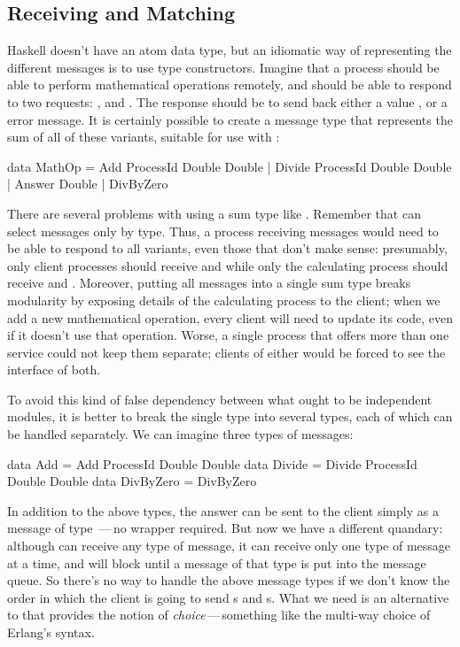 \documentclass[preprint]{sigplanconf}
\begin{document}
\subsection{Receiving and Matching}

Haskell doesn't have an atom data type, but an idiomatic way of representing the different messages is to use type constructors. Imagine that a process should be able to perform mathematical operations remotely, and should be able to respond to two requests: , and . 
The response should be to send back either a value , or a  error message.
It is certainly possible to create a message type that represents the sum of all of these variants, suitable for use with :

\begin{code}
data MathOp = Add ProcessId Double Double
            | Divide ProcessId Double Double
            | Answer Double
            | DivByZero
\end{code}

There are several problems with using a sum type like .
Remember that  can select messages only by type.
Thus, a process receiving  messages would need to be able to respond to all variants, even those that don't make sense: presumably, only client processes should receive  and  while only the calculating process should receive  and . 
Moreover, putting all messages into a single sum type breaks modularity by exposing details of the calculating process to the client; when we add a new mathematical operation, every client will need to update its code, even if it doesn't use that operation.
Worse, a single process that offers more than one service could not keep them separate; clients of either would be forced to see the interface of both.

To avoid this kind of false dependency between what ought to be independent modules, it is better to break the single  type into several types, each of which can be handled separately. 
We can imagine three types of messages:

\begin{code}
data Add = Add ProcessId Double Double
data Divide = Divide ProcessId Double Double
data DivByZero = DivByZero
\end{code}
\noindent
In addition to the above types, the answer can be sent to the client simply as a message of type \,---\,no wrapper required. 
But now we have a different quandary: although  can receive any type of message, it can receive only one type of message at a time, and will block until a message of that type is put into the message queue. 
So there's no way to handle the above message types if we don't know the order in which the client is going to send s and s. 
What we need is an alternative to  that provides the notion of {\em choice}\,---\,something like the multi-way choice of Erlang's  syntax.
 
\end{document}
